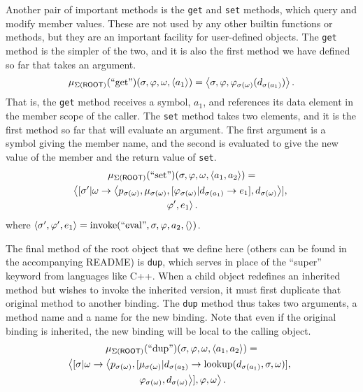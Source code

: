 \documentclass[twocolumn]{article}
\begin{document}
Another pair of important methods is the \texttt{get} and \texttt{set}
methods, which query and modify member values. These are not used by
any other builtin functions or methods, but they are an important
facility for user-defined objects. The \texttt{get} method is the
simpler of the two, and it is also the first method we have defined so
far that takes an argument.
\[ \mu_{\Sigma(\mathsf{ROOT})}(\text{``get''})(\sigma,\varphi,\omega,
\left< a_1\right>) = \left< \sigma, \varphi,
\varphi_{\sigma(\omega)}(d_{\sigma(a_1)})\right>.\] That is, the
\texttt{get} method receives a symbol, $a_1$, and references its data
element in the member scope of the caller. The \texttt{set} method
takes two elements, and it is the first method so far that will
evaluate an argument. The first argument is a symbol giving the member
name, and the second is evaluated to give the new value of the member
and the return value of \texttt{set}.
\begin{multline*}
  \mu_{\Sigma(\mathsf{ROOT})}(\text{``set''})(\sigma,\varphi,\omega,
  \left< a_1,a_2\right>) =\\ \left< [\sigma'|\omega\rightarrow \left< p_{\sigma(\omega)},
  \mu_{\sigma(\omega)},[\varphi_{\sigma(\omega)}|d_{\sigma(a_1)}\rightarrow e_1],
  d_{\sigma(\omega)}\right>],\right.\\\left.\varphi', e_1\right>.
\end{multline*}
where $\left< \sigma',\varphi',e_1 \right> = \operatorname{invoke}(\text{``eval''},\sigma,
\varphi, a_2, \left<\right>)$.

The final method of the root object that we define here (others can be
found in the accompanying README) is \texttt{dup}, which serves in
place of the ``super'' keyword from languages like C++. When a child
object redefines an inherited method but wishes to invoke the
inherited version, it must first duplicate that original method to
another binding. The \texttt{dup} method thus takes two arguments, a
method name and a name for the new binding. Note that even if the
original binding is inherited, the new binding will be local to the
calling object.
\begin{multline*}
  \mu_{\Sigma(\mathsf{ROOT})}(\text{``dup''})(\sigma,\varphi,\omega,
  \left< a_1,a_2\right>) =\\ \left< [\sigma|\omega\rightarrow \left<
  p_{\sigma(\omega)}, [\mu_{\sigma(\omega)}|d_{\sigma(a_2)}\rightarrow
  \operatorname{lookup}(d_{\sigma(a_1)},\sigma,\omega)],\right.\right.\\\left.\left.
  \varphi_{\sigma(\omega)},
  d_{\sigma(\omega)}\right>],\varphi, \omega\right>.
\end{multline*}
\end{document}
